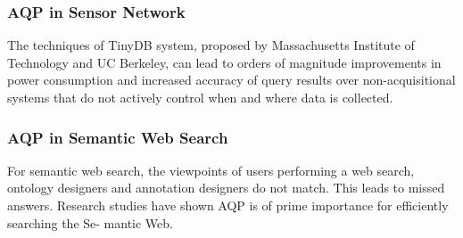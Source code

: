 \documentclass[twocolumn]{article}
\begin{document}
\subsubsection*{AQP in Sensor Network}
The techniques of TinyDB system, proposed by Massachusetts Institute of Technology and UC Berkeley, can lead to orders of magnitude improvements in power consumption and increased accuracy of query results over non-acquisitional systems that do not actively control when and where data is collected.

\subsubsection*{AQP in Semantic Web Search}
For semantic web search, the viewpoints of users performing a web search, ontology designers and annotation designers do not match. This leads to missed answers. Research studies have shown AQP is of prime importance for efficiently searching the Se- mantic Web.





\end{document}

